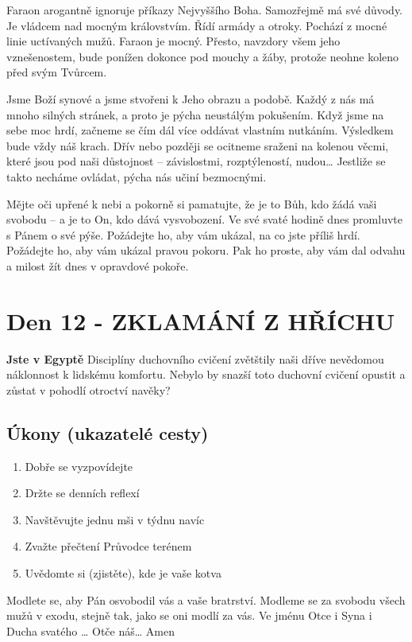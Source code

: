 \documentclass[11pt]{article}
\newcommand{\zacatekDruhyTyden}{
  \textbf{Jste v Egyptě} \newline
  Disciplíny duchovního cvičení zvětštily naši dříve nevědomou náklonnost k lidskému komfortu.
  Nebylo by snazší toto duchovní cvičení opustit a zůstat v pohodlí otroctví navěky?

  \subsection*{Úkony (ukazatelé cesty)}
\begin{enumerate}
  \item Dobře se vyzpovídejte
  \item Držte se denních reflexí
  \item Navštěvujte jednu mši v týdnu navíc
  \item Zvažte přečtení Průvodce terénem
  \item Uvědomte si (zjistěte), kde je vaše kotva
\end{enumerate}
Modlete se, aby Pán osvobodil vás a vaše bratrství. \newline
Modleme se za svobodu všech mužů v exodu, stejně tak, jako se oni modlí za vás.\newline
Ve jménu Otce i Syna i Ducha svatého …  Otče náš… Amen
}
\begin{document}
Faraon arogantně ignoruje příkazy Nejvyššího Boha. Samozřejmě má své důvody. Je vládcem nad mocným
královstvím. Řídí armády a otroky. Pochází z mocné linie uctívaných mužů. Faraon je mocný. Přesto,
navzdory všem jeho vznešenostem, bude ponížen dokonce pod mouchy a žáby, protože neohne koleno před
svým Tvůrcem.

Jsme Boží synové a jsme stvořeni k Jeho obrazu a podobě. Každý z nás má mnoho silných stránek, a proto
je pýcha neustálým pokušením. Když jsme na sebe moc hrdí, začneme se čím dál více oddávat vlastním
nutkáním. Výsledkem bude vždy náš krach. Dřív nebo později se ocitneme sraženi na kolenou věcmi, které
jsou pod naši důstojnost – závislostmi, rozptýleností, nudou… Jestliže se takto necháme ovládat, pýcha nás
učiní bezmocnými.

Mějte oči upřené k nebi a pokorně si pamatujte, že je to Bůh, kdo žádá vaši svobodu – a je to On, kdo dává
vysvobození. Ve své svaté hodině dnes promluvte s Pánem o své pýše. Požádejte ho, aby vám ukázal, na
co jste příliš hrdí. Požádejte ho, aby vám ukázal pravou pokoru. Pak ho proste, aby vám dal odvahu a milost
žít dnes v opravdové pokoře.

\newpage
\section{Den 12 - ZKLAMÁNÍ Z HŘÍCHU}
\zacatekDruhyTyden
\end{document}
